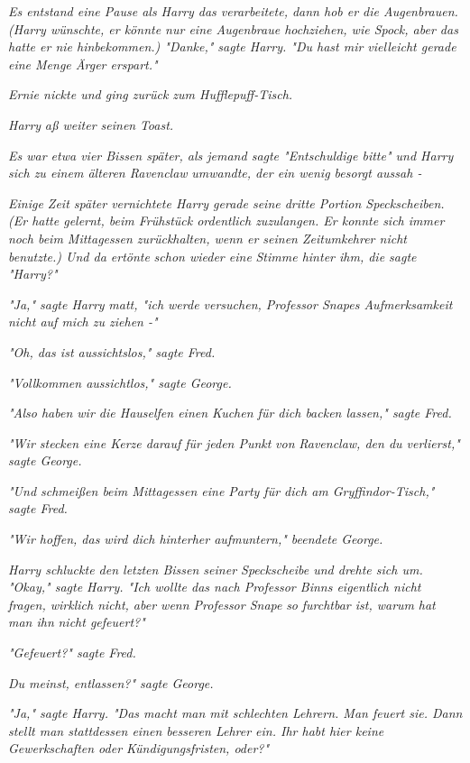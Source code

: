 {\emph{Es entstand eine Pause als Harry das verarbeitete, dann hob er die Augenbrauen. (Harry wünschte, er könnte nur eine Augenbraue hochziehen, wie Spock, aber das hatte er nie hinbekommen.) "Danke," sagte Harry. "Du hast mir vielleicht gerade eine Menge Ärger erspart."}

\emph{Ernie nickte und ging zurück zum Hufflepuff-Tisch.}

\emph{Harry} \emph{aß weiter seinen} \emph{Toast.}

\emph{Es war etwa vier Bissen später, als jemand sagte "Entschuldige bitte" und Harry sich zu einem älteren Ravenclaw} \emph{umwandte, der ein wenig besorgt aussah -}

\emph{Einige Zeit später vernichtete Harry gerade seine dritte Portion Speckscheiben. (Er hatte gelernt, beim Frühstück ordentlich zuzulangen. Er konnte sich immer noch beim Mittagessen zurückhalten, wenn er seinen Zeitumkehrer nicht benutzte.) Und da ertönte} \emph{schon wieder eine} \emph{Stimme hinter ihm, die sagte "Harry?"}

\emph{"Ja," sagte Harry} \emph{matt, "ich werde versuchen, Professor Snapes Aufmerksamkeit nicht auf mich zu ziehen -"}

\emph{"Oh, das ist aussichtslos," sagte Fred.}

\emph{"Vollkommen aussichtlos," sagte George.}

\emph{"Also haben wir die Hauselfen einen Kuchen für dich backen lassen," sagte Fred.}

\emph{"Wir stecken eine Kerze darauf für jeden Punkt} \emph{von} \emph{Ravenclaw, den du verlierst," sagte George.}

\emph{"Und schmeißen beim Mittagessen eine Party für dich am Gryffindor-Tisch," sagte Fred.}

\emph{"Wir hoffen, das wird dich hinterher aufmuntern," beendete George.}

\emph{Harry schluckte den letzten Bissen seiner Speckscheibe und drehte sich um. "Okay," sagte Harry. "Ich wollte das nach Professor Binns eigentlich nicht fragen, wirklich nicht, aber wenn Professor Snape} \emph{\emph{so}} \emph{furchtbar ist, warum} \emph{hat man ihn} \emph{nicht gefeuert?"}

\emph{"Gefeuert?" sagte Fred.}

\emph{Du meinst, entlassen?" sagte George.}

\emph{"Ja," sagte Harry. "Das macht man mit schlechten Lehrern. Man feuert sie. Dann stellt man stattdessen einen besseren Lehrer ein. Ihr habt hier keine Gewerkschaften oder Kündigungsfristen, oder?"}

}
